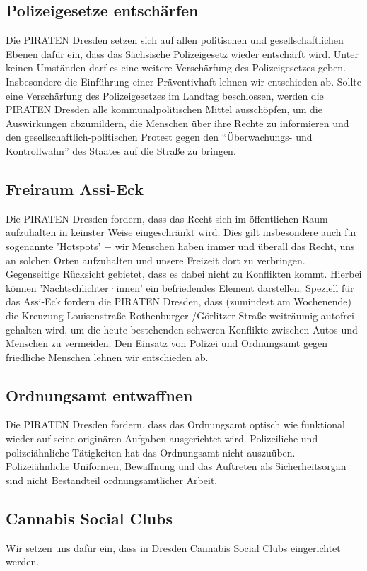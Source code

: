 \documentclass[a4paper, 11pt]{article}
\begin{document}
\subsection{Polizeigesetze entschärfen}
Die PIRATEN Dresden setzen sich auf allen politischen und gesellschaftlichen Ebenen dafür ein, dass das Sächsische Polizeigesetz wieder entschärft wird. Unter keinen Umständen darf es eine weitere Verschärfung des Polizeigesetzes geben. Insbesondere die Einführung einer Präventivhaft lehnen wir entschieden ab. Sollte eine Verschärfung des Polizeigesetzes im Landtag beschlossen, werden die PIRATEN Dresden alle kommunalpolitischen Mittel ausschöpfen, um die Auswirkungen abzumildern, die Menschen über ihre Rechte zu informieren und den gesellschaftlich-politischen Protest gegen den ``Überwachungs- und Kontrollwahn'' des Staates auf die Straße zu bringen.


\subsection{Freiraum Assi-Eck}
Die PIRATEN Dresden fordern, dass das Recht sich im öffentlichen Raum aufzuhalten in keinster Weise eingeschränkt wird. Dies gilt insbesondere auch für sogenannte 'Hotspots' $-$ wir Menschen haben immer und überall das Recht, uns an solchen Orten aufzuhalten und unsere Freizeit dort zu verbringen. Gegenseitige Rücksicht gebietet, dass es dabei nicht zu Konflikten kommt. Hierbei können 'Nachtschlichter·innen' ein befriedendes Element darstellen. Speziell für das Assi-Eck fordern die PIRATEN Dresden, dass (zumindest am Wochenende) die Kreuzung Louisenstraße-Rothenburger-/Görlitzer Straße weiträumig autofrei gehalten wird, um die heute bestehenden schweren Konflikte zwischen Autos und Menschen zu vermeiden. Den Einsatz von Polizei und Ordnungsamt gegen friedliche Menschen lehnen wir entschieden ab.


\subsection{Ordnungsamt entwaffnen}
Die PIRATEN Dresden fordern, dass das Ordnungsamt optisch wie funktional wieder auf seine originären Aufgaben ausgerichtet wird. Polizeiliche und polizeiähnliche Tätigkeiten hat das Ordnungsamt nicht auszuüben. Polizeiähnliche Uniformen, Bewaffnung und das Auftreten als Sicherheitsorgan sind nicht Bestandteil ordnungsamtlicher Arbeit.


\subsection{Cannabis Social Clubs}
Wir setzen uns dafür ein, dass in Dresden Cannabis Social Clubs eingerichtet werden.
\end{document}
